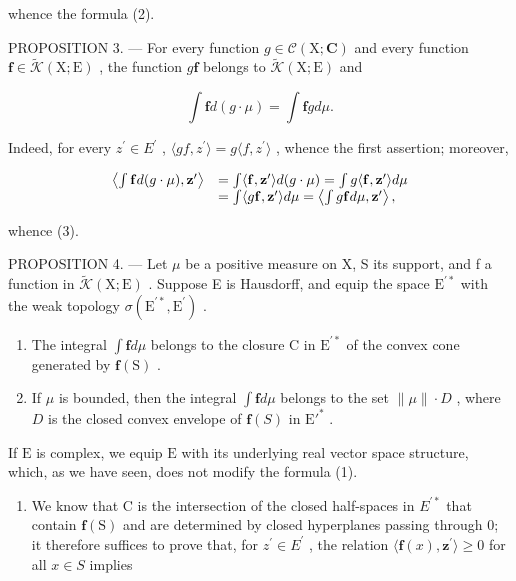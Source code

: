 whence the formula (2).

PROPOSITION 3. --- For every function \(g \in \mathcal{C}(\mathrm{X};\mathbf{C})\) and every function \(\mathbf{f} \in \widetilde{\mathcal{K}}(\mathrm{X};\mathrm{E})\) , the function \(g\mathbf{f}\) belongs to \(\widetilde{\mathcal{K}}(\mathrm{X};\mathrm{E})\) and

\[
\int \mathbf {f} d (g \cdot \mu) = \int \mathbf {f} g d \mu .\tag{3}
\]

Indeed, for every \(z^{\prime} \in E^{\prime}\) , \(\langle gf, z^{\prime} \rangle = g\langle f, z^{\prime} \rangle\) , whence the first assertion; moreover,

\[
\begin{array}{r l} \left\langle \int \mathbf {f} d (g \cdot \mu), \mathbf {z} ^ {\prime} \right\rangle & = \int \langle \mathbf {f}, \mathbf {z} ^ {\prime} \rangle d (g \cdot \mu) = \int g \langle \mathbf {f}, \mathbf {z} ^ {\prime} \rangle d \mu \\ & = \int \langle g \mathbf {f}, \mathbf {z} ^ {\prime} \rangle d \mu = \left\langle \int g \mathbf {f} d \mu , \mathbf {z} ^ {\prime} \right\rangle , \end{array}
\]

whence (3).

PROPOSITION 4. --- Let \(\mu\) be a positive measure on X, S its support, and f a function in \(\widetilde{\mathcal{K}}(\mathrm{X};\mathrm{E})\) . Suppose E is Hausdorff, and equip the space \(\mathrm{E}^{\prime*}\) with the weak topology \(\sigma(\mathrm{E}^{\prime*},\mathrm{E}^{\prime})\) .

\begin{enumerate}
\def\labelenumi{(\roman{enumi})}
\item
  The integral \(\int \mathbf{f}d\mu\) belongs to the closure C in \(\mathrm{E}^{\prime *}\) of the convex cone generated by \(\mathbf{f}(\mathrm{S})\) .
\item
  If \(\mu\) is bounded, then the integral \(\int \mathbf{f} d\mu\) belongs to the set \(\| \mu \| \cdot D\) , where \(D\) is the closed convex envelope of \(\mathbf{f}(S)\) in \(\mathrm{E}'^*\) .
\end{enumerate}

If \(\mathrm{E}\) is complex, we equip \(\mathrm{E}\) with its underlying real vector space structure, which, as we have seen, does not modify the formula (1).

\begin{enumerate}
\def\labelenumi{(\roman{enumi})}
\tightlist
\item
  We know that C is the intersection of the closed half-spaces in \(E^{\prime*}\) that contain \(\mathbf{f}(\mathrm{S})\) and are determined by closed hyperplanes passing through 0; it therefore suffices to prove that, for \(z^{\prime} \in E^{\prime}\) , the relation \(\langle\mathbf{f}(x), \mathbf{z}^{\prime}\rangle \geqslant 0\) for all \(x \in S\) implies
\end{enumerate}


